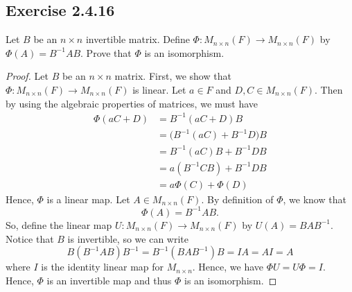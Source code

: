 \subsection*{Exercise 2.4.16} Let \( B  \) be an \( n \times n  \) invertible matrix. Define \( \Phi: {M}_{n \times n}(F) \to {M}_{n \times n }(F) \) by \( \Phi(A) = B^{-1} A B  \). Prove that \( \Phi  \) is an isomorphism.
\begin{proof}
    Let \( B  \) be an \( n \times n  \) matrix. First, we show that \( \Phi: {M}_{n \times n}(F) \to {M}_{n \times n}(F)   \) is linear. 
    Let \( a \in F  \) and \( D, C \in {M}_{n \times n}(F) \). Then by using the algebraic properties of matrices, we must have
    \begin{align*}
        \Phi(aC + D) &= B^{-1}(aC + D)B \\
                  &=  \Big( B^{-1}(aC) + B^{-1}D \Big) B \\ 
                  &= B^{-1}(aC)B + B^{-1} D B \\
                  &= a (B^{-1} C B) + B^{-1}D B \\
                  &= a\Phi(C) + \Phi(D)
    \end{align*}
    Hence, \( \Phi  \) is a linear map. Let \( A \in {M}_{n \times n }(F) \). By definition of \( \Phi  \), we know that 
    \[  \Phi(A) = B^{-1}A B. \]
    So, define the linear map \( U: {M}_{n \times n}(F) \to {M}_{n \times n}(F) \) by \( U(A) = B A B^{-1} \).
    Notice that \( B  \) is invertible, so we can write
    \[  B (B^{-1} A B) B^{-1}  = B^{-1} (B A B^{-1}) B = IA = AI = A  \] where \( I  \) is the identity linear map for \( {M}_{n \times n } \).
    Hence, we have \( \Phi U = U \Phi = I  \). Hence, \( \Phi  \) is an invertible map and thus \( \Phi  \) is an isomorphism.
\end{proof}


